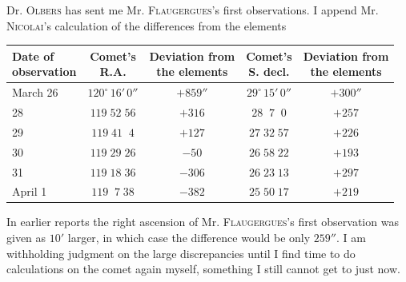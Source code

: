 \par\indent Dr. \textsc{Olbers} has sent me Mr. \textsc{Flaugergues}’s first observations. I append Mr. \textsc{Nicolai}’s calculation of the differences from the elements

\begin{center}\fontsize{9}{11}\selectfont\setlength{\tabcolsep}{3pt}\renewcommand{\arraystretch}{1.15}\begin{tabular}{l|c|c|c|c}
\shortstack{Date of\\observation} & \shortstack{Comet’s\\R.A.} & \shortstack{Deviation from\\the elements} & \shortstack{Comet’s\\S. decl.} & \shortstack{Deviation from\\the elements}\\\hline
March 26 & $120^\circ\,16'\,0''$ & $+859''$ & $29^\circ\,15'\,0''$ & $+300''$\\
28 & $119\;52\;56$ & $+316$ & $28\;\;7\;\;0$ & $+257$\\
29 & $119\;41\;\;4$ & $+127$ & $27\;32\;57$ & $+226$\\
30 & $119\;29\;26$ & $-50$ & $26\;58\;22$ & $+193$\\
31 & $119\;18\;36$ & $-306$ & $26\;23\;13$ & $+297$\\
April 1 & $119\;\;7\;38$ & $-382$ & $25\;50\;17$ & $+219$\\
\end{tabular}\end{center}

\par\indent In earlier reports the right ascension of Mr. \textsc{Flaugergues}’s first observation was given as $10'$ larger, in which case the difference would be only $259''$. I am withholding judgment on the large discrepancies until I find time to do calculations on the comet again myself, something I still cannot get to just now.


